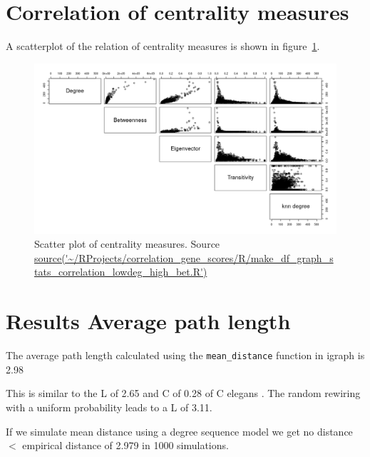 \section{Correlation of centrality measures}

A scatterplot of the relation of centrality measures is shown in figure~\ref{fig:scatter plot of multiple centrality measures}.

\begin{figure}
    \centering
    \includegraphics[width=\textwidth]{images/Rplot_pairs_plot.png}
    \caption{Scatter plot of centrality measures. Source \url{source('~/RProjects/correlation_gene_scores/R/make_df_graph_stats_correlation_lowdeg_high_bet.R')}}
    \label{fig:scatter plot of multiple centrality measures}
\end{figure}

\section{ Results Average path length}
\label{sec:Results average path length and transitivity}
The average path length calculated using the \texttt{mean\_distance} function in igraph is 2.98


This is similar to the L of 2.65 and C of 0.28 of C elegans . The random rewiring with a uniform probability leads to a L of 3.11. 

If we simulate mean distance using a degree sequence model we get no distance $<$ empirical distance of 2.979 in 1000 simulations.
